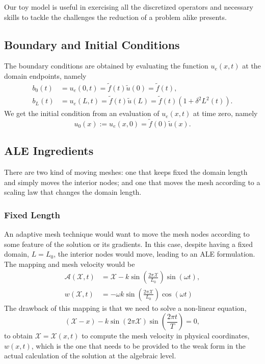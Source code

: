 \documentclass[../../main.tex]{subfiles}
\newcommand{\alemap}{\ensuremath{\mathcal{A}}}
\newcommand{\aleX}{\ensuremath{\mathcal{X}}}
\begin{document}
Our toy model is useful in exercising all the discretized operators and necessary skills to tackle the challenges the reduction of a problem alike presents. 

\subsection{Boundary and Initial Conditions}
The boundary conditions are obtained by evaluating the function $u_e(x,t)$ at the domain endpoints, namely 
\begin{subequations}
    \label{eq:1d_fom_mfp_boundary_conditions}
    \begin{align}
        b_0(t) &= u_e(0,t) = \tilde{f}(t) \tilde{u}(0) = \tilde{f}(t), \\
        b_L(t) &= u_e(L,t) = \tilde{f}(t) \tilde{u}(L) = \tilde{f}(t)\left(1 + \delta^2L^2(t)\right).
    \end{align}
\end{subequations}
We get the initial condition from an evaluation of $u_e(x,t)$ at time zero, namely
\begin{equation}
    u_0(x) := u_e(x,0) = \tilde{f}(0) \tilde{u}(x).
\end{equation}

\subsection{ALE Ingredients}
There are two kind of moving meshes: one that keeps fixed the domain length and simply moves the interior nodes; and one that moves the mesh according to a scaling law that changes the domain length.

\subsubsection{Fixed Length}
An adaptive mesh technique would want to move the mesh nodes according to some feature of the solution or its gradients. 
In this case, despite having a fixed domain, $L=L_0$, the interior nodes would move, leading to an ALE formulation.
The mapping and mesh velocity would be 
\begin{subequations}
    \begin{align}
        \alemap(\aleX, t) &= \aleX - k \sin(\frac{2\pi \aleX}{L_0}) \sin(\omega t), \\
        w(\aleX, t) &= - \omega k \sin(\frac{2\pi \aleX}{L_0}) \cos (\omega t)
    \end{align}
\end{subequations}
The drawback of this mapping is that we need to solve a non-linear equation,
\begin{equation}
    \left(\aleX -x \right) - k \sin(2\pi \aleX) \sin \left(\frac{2\pi t}{T}\right) = 0,
\end{equation}
to obtain $\aleX = \aleX(x,t)$ to compute the mesh velocity in physical coordinates, $w(x,t)$, which is the one that needs to be provided to the weak form in the actual calculation of the solution at the algebraic level.
\end{document}

